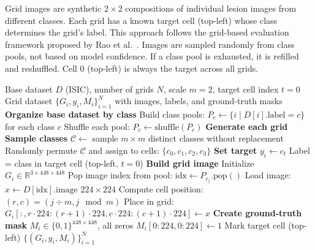 \documentclass[11pt]{article}
\begin{document}
Grid images are synthetic $2 \times 2$ compositions of individual lesion images from different classes. Each grid has a known target cell (top-left) whose class determines the grid's label. This approach follows the grid-based evaluation framework proposed by Rao et al.~\citep{rao2022understanding}. Images are sampled randomly from class pools, not based on model confidence. If a class pool is exhausted, it is refilled and reshuffled. Cell 0 (top-left) is always the target across all grids.

\begin{algorithm}[H]
\caption{Grid Dataset Generation}
\label{alg:grid_generation}
\begin{algorithmic}[1]
\REQUIRE Base dataset $D$ (ISIC), number of grids $N$, scale $m=2$, target cell index $t=0$
\ENSURE Grid dataset $\{G_i, y_i, M_i\}_{i=1}^N$ with images, labels, and ground-truth masks
\STATE \textbf{Organize base dataset by class}
\STATE Build class pools: $P_c \leftarrow \{i \mid D[i].\text{label} = c\}$ for each class $c$
\STATE Shuffle each pool: $P_c \leftarrow \text{shuffle}(P_c)$
\STATE \textbf{Generate each grid}
    \STATE \textbf{ Sample classes}
    \STATE $\mathcal{C} \leftarrow$ sample $m \times m$ distinct classes without replacement
    \STATE Randomly permute $\mathcal{C}$ and assign to cells: $\{c_0, c_1, c_2, c_3\}$
    \STATE \textbf{ Set target}
    \STATE $y_i \leftarrow c_t$ \quad  Label = class in target cell (top-left, $t=0$)
    \STATE \textbf{ Build grid image}
    \STATE Initialize $G_i \in \mathbb{R}^{3 \times 448 \times 448}$
        \STATE Pop image index from pool: $\text{idx} \leftarrow P_{c_j}.\text{pop}()$
        \STATE Load image: $x \leftarrow D[\text{idx}].\text{image}$ \quad  $224 \times 224$
        \STATE Compute cell position: $(r, c) = (j \div m, j \mod m)$
        \STATE Place in grid: $G_i[:, r \cdot 224:(r+1) \cdot 224, c \cdot 224:(c+1) \cdot 224] \leftarrow x$
    \ENDFOR
    \STATE \textbf{ Create ground-truth mask}
    \STATE $M_i \in \{0,1\}^{448 \times 448}$, all zeros
    \STATE $M_i[0:224, 0:224] \leftarrow 1$ \quad  Mark target cell (top-left)
\ENDFOR
\RETURN $\{(G_i, y_i, M_i)\}_{i=1}^N$
\end{algorithmic}
\end{algorithm}
\end{document}
